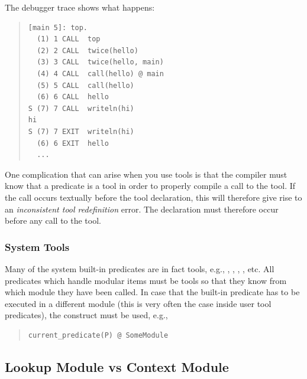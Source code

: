 The debugger trace shows what happens:
\begin{quote}
\begin{verbatim}
[main 5]: top.
  (1) 1 CALL  top
  (2) 2 CALL  twice(hello)
  (3) 3 CALL  twice(hello, main)
  (4) 4 CALL  call(hello) @ main
  (5) 5 CALL  call(hello)
  (6) 6 CALL  hello
S (7) 7 CALL  writeln(hi)
hi
S (7) 7 EXIT  writeln(hi)
  (6) 6 EXIT  hello
  ...
\end{verbatim}
\end{quote}

One complication that can arise when you use tools is that the compiler
must know that a predicate is a tool in order to properly compile
a call to the tool.
If the call occurs textually before the tool
declaration,  this will therefore give rise to an
\emph{inconsistent tool redefinition} error.
The
declaration must therefore occur before any call to the tool.


\subsubsection{System Tools}
Many of the system built-in predicates are in fact tools, e.g.,
,
,
,
, etc.
All predicates which handle modular items must be tools
so that they know from which module they have been called.
In case that the built-in predicate has to be executed in
a different module (this is very often the case inside
user tool predicates), the
%
construct must be used, e.g.,
\begin{quote}
\begin{verbatim}
current_predicate(P) @ SomeModule
\end{verbatim}
\end{quote}


\subsection{Lookup Module vs Context Module}

